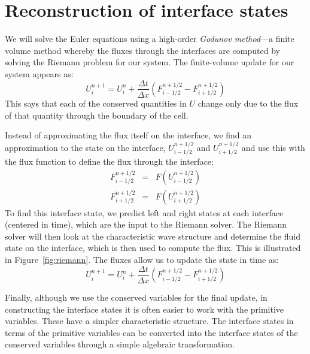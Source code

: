 \documentclass[11pt]{article}
\begin{document}
\section{Reconstruction of interface states}

\label{sec:onedrecon}

We will solve the Euler equations using a high-order {\em Godunov
  method}---a finite volume method whereby the fluxes through the
interfaces are computed by solving the Riemann problem for our system.
The finite-volume update for our system appears as:
\begin{equation}
U^{n+1}_i = U^n_i + \frac{\Delta t}{\Delta x} \left ( F_{i-1/2}^{n+1/2} - F_{i+1/2}^{n+1/2} \right )
\end{equation}
This says that each of the conserved quantities in $U$ change only due
to the flux of that quantity through the boundary of the cell.

Instead of approximating the flux itself on the interface, we find an
approximation to the state on the interface, $U_{i-1/2}^{n+1/2}$ and
$U_{i+1/2}^{n+1/2}$ and use this with the flux function to define the
flux through the interface:
\begin{eqnarray}
F_{i-1/2}^{n+1/2} &=& F(U_{i-1/2}^{n+1/2}) \\
F_{i+1/2}^{n+1/2} &=& F(U_{i+1/2}^{n+1/2})
\end{eqnarray}
To find this interface state, we predict left and right states at each
interface (centered in time), which are the input to the Riemann
solver.  The Riemann solver will then look at the characteristic wave
structure and determine the fluid state on the interface, which is
then used to compute the flux.  This is illustrated in
Figure~\ref{fig:riemann}.  The fluxes allow us to update the state in
time as:
\begin{equation}
U^{n+1}_i = U^n_i + \frac{\Delta t}{\Delta x} \left ( F_{i-1/2}^{n+1/2} - F_{i+1/2}^{n+1/2} \right )
\end{equation}

Finally, although we use the conserved variables for the final update,
in constructing the interface states it is often easier to work with
the primitive variables.  These have a simpler characteristic
structure.  The interface states in terms of the primitive variables
can be converted into the interface states of the conserved variables
through a simple algebraic transformation.
\end{document}
